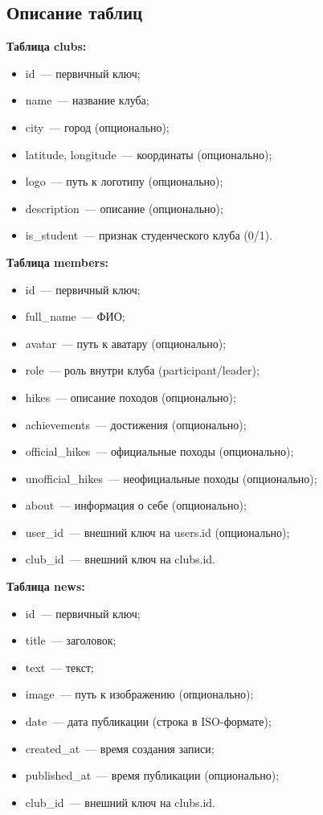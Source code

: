 \documentclass[utf8, russian]{eskdtext}
\begin{document}
\subsection{Описание таблиц}
\textbf{Таблица clubs:}
\begin{itemize}
  \item id~--- первичный ключ;
  \item name~--- название клуба;
  \item city~--- город (опционально);
  \item latitude, longitude~--- координаты (опционально);
  \item logo~--- путь к логотипу (опционально);
  \item description~--- описание (опционально);
  \item is\_student~--- признак студенческого клуба (0/1).
\end{itemize}

\textbf{Таблица members:}
\begin{itemize}
  \item id~--- первичный ключ;
  \item full\_name~--- ФИО;
  \item avatar~--- путь к аватару (опционально);
  \item role~--- роль внутри клуба (participant/leader);
  \item hikes~--- описание походов (опционально);
  \item achievements~--- достижения (опционально);
  \item official\_hikes~--- официальные походы (опционально);
  \item unofficial\_hikes~--- неофициальные походы (опционально);
  \item about~--- информация о себе (опционально);
  \item user\_id~--- внешний ключ на users.id (опционально);
  \item club\_id~--- внешний ключ на clubs.id.
\end{itemize}

\textbf{Таблица news:}
\begin{itemize}
  \item id~--- первичный ключ;
  \item title~--- заголовок;
  \item text~--- текст;
  \item image~--- путь к изображению (опционально);
  \item date~--- дата публикации (строка в ISO-формате);
  \item created\_at~--- время создания записи;
  \item published\_at~--- время публикации (опционально);
  \item club\_id~--- внешний ключ на clubs.id.
\end{itemize}
\end{document}
